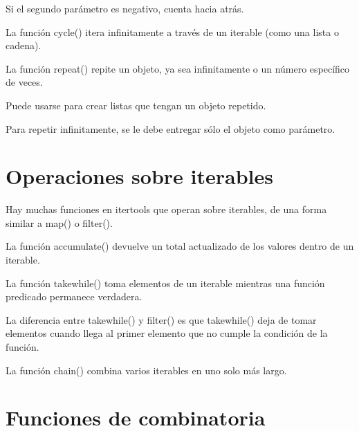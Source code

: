 \documentclass{report}
\begin{document}
Si el segundo parámetro es negativo, cuenta hacia atrás.


La función cycle() itera infinitamente a través de un iterable (como una lista o cadena).



La función repeat() repite un objeto, ya sea infinitamente o un número específico de veces.


Puede usarse para crear listas que tengan un objeto repetido.


Para repetir infinitamente, se le debe entregar sólo el objeto como parámetro.


\section{Operaciones sobre iterables}

Hay muchas funciones en itertools que operan sobre iterables, de una forma similar a map() o filter().\smallskip

La función accumulate() devuelve un total actualizado de los valores dentro de un iterable.


La función takewhile() toma elementos de un iterable mientras una función predicado permanece verdadera.


La diferencia entre takewhile() y filter() es que takewhile() deja de tomar elementos cuando llega al primer elemento que no cumple la condición de la función.


La función chain() combina varios iterables en uno solo más largo.


\section{Funciones de combinatoria}
\end{document}

